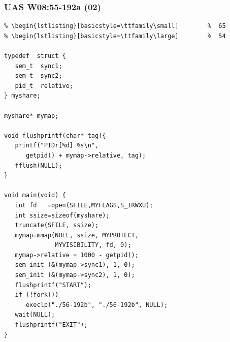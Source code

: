 \documentclass[aspectratio=169, xcolor=table, notheorems, hyperref={pdfpagelabels=false}]{beamer}
\begin{document}
\begin{frame}[fragile]
\frametitle{UAS W08:55-192a (02)}
\begin{lstlisting}[basicstyle=\ttfamily\tiny]         % 108
% \begin{lstlisting}[basicstyle=\ttfamily\footnotesize] %  72
% \begin{lstlisting}[basicstyle=\ttfamily\small]        %  65
% \begin{lstlisting}[basicstyle=\ttfamily\large]        %  54

typedef  struct {
   sem_t  sync1;
   sem_t  sync2;
   pid_t  relative;
} myshare;

myshare* mymap;

void flushprintf(char* tag){
   printf("PIDr[%d] %s\n", 
      getpid() + mymap->relative, tag);
   fflush(NULL);
}

void main(void) {
   int fd   =open(SFILE,MYFLAGS,S_IRWXU);
   int ssize=sizeof(myshare);
   truncate(SFILE, ssize);
   mymap=mmap(NULL, ssize, MYPROTECT, 
              MYVISIBILITY, fd, 0);
   mymap->relative = 1000 - getpid();
   sem_init (&(mymap->sync1), 1, 0);
   sem_init (&(mymap->sync2), 1, 0);
   flushprintf("START");
   if (!fork())
      execlp("./56-192b", "./56-192b", NULL);
   wait(NULL);
   flushprintf("EXIT");
}

\end{lstlisting}
\end{frame}

\end{document}
